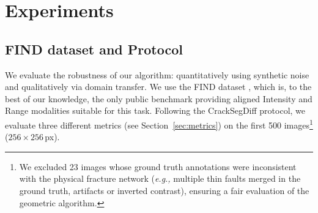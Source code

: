 \documentclass[conference]{IEEEtran}
\newcommand{\eg}[0]{\textit{e.g., }}
\begin{document}
\section{Experiments}



\subsection{FIND dataset and Protocol}
We evaluate the robustness of our algorithm: quantitatively using synthetic noise and qualitatively via domain transfer. We use the FIND dataset \cite{FIND2022}, which is, to the best of our knowledge, the only public benchmark providing aligned Intensity and Range modalities suitable for this task. 
Following the CrackSegDiff protocol, we evaluate three different metrics (see Section~\ref{sec:metrics}) on the first 500 images\footnote{%
We excluded 23 images whose ground truth annotations were inconsistent with the physical fracture network (\eg multiple thin faults merged in the ground truth, artifacts or inverted contrast), ensuring a fair evaluation of the geometric algorithm.
} ($256 \times 256$\,px).
\end{document}
